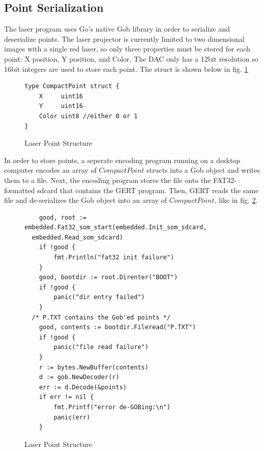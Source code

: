 \subsection{Point Serialization}
The laser program uses Go's native Gob library in order to serialize and
deserialize points. The laser projector is currently limited to
two dimensional images with a single red laser, so only three
properties must be stored for each point: X position, Y position,
and Color. The DAC only has a 12bit resolution so 16bit integers are used
to store each point. The struct is shown below in fig. \ref{fig:cpoint}

\begin{figure}[!h]
\begin{center}
\begin{lstlisting}
type CompactPoint struct {
	X     uint16
	Y     uint16
	Color uint8 //either 0 or 1
}
\end{lstlisting}
\end{center}
  \caption{Laser Point Structure} \label{fig:cpoint}
\end{figure}

In order to store points, a seperate encoding program running
on a desktop computer encodes an array of $CompactPoint$ structs into
a Gob object and writes them to a file. Next, the encoding program stores
the file onto the FAT32-formatted sdcard that contains the GERT
program. Then, GERT reads the same file and de-serializes the Gob object
into an array of $CompactPoint$, like in fig. \ref{fig:loadpoints}.

\begin{figure}[!h]
\begin{center}
\begin{lstlisting}
	good, root := embedded.Fat32_som_start(embedded.Init_som_sdcard,
  embedded.Read_som_sdcard)
	if !good {
		fmt.Println("fat32 init failure")
	}
	good, bootdir := root.Direnter("BOOT")
	if !good {
		panic("dir entry failed")
	}
  /* P.TXT contains the Gob'ed points */
	good, contents := bootdir.Fileread("P.TXT")
	if !good {
		panic("file read failure")
	}
	r := bytes.NewBuffer(contents)
	d := gob.NewDecoder(r)
	err := d.Decode(&points)
	if err != nil {
		fmt.Printf("error de-GOBing:\n")
		panic(err)
	}
\end{lstlisting}
\end{center}
  \caption{Laser Point Structure} \label{fig:loadpoints}
\end{figure}


